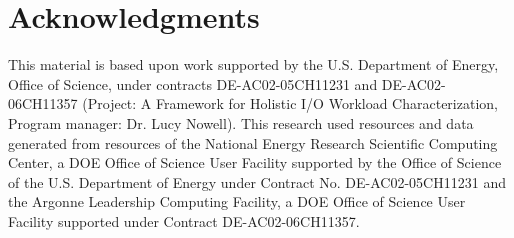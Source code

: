 \section*{Acknowledgments}
This material is based upon work supported by the U.S. Department of Energy,
Office of Science, under contracts DE-AC02-05CH11231 and DE-AC02-06CH11357
(Project: A Framework for Holistic I/O Workload Characterization, Program
manager: Dr. Lucy Nowell).
This research used resources and data generated from resources of the
National Energy Research Scientific Computing Center, a DOE Office of
Science
User Facility supported by the Office of Science of the U.S. Department of
Energy under Contract No. DE-AC02-05CH11231 and the Argonne Leadership
Computing Facility, a DOE Office of Science User Facility supported under
Contract DE-AC02-06CH11357.
